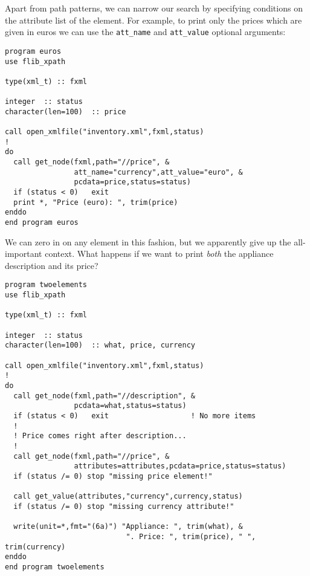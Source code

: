 \documentclass[11pt]{article}
\begin{document}
Apart from path patterns, we can narrow our search by specifying
conditions on the attribute list of the element. For example, to print
only the prices which are given in euros we can use the
\texttt{att\_name} and \texttt{att\_value} optional arguments:
%
\begin{verbatim}
program euros
use flib_xpath

type(xml_t) :: fxml

integer  :: status
character(len=100)  :: price

call open_xmlfile("inventory.xml",fxml,status)
!
do
  call get_node(fxml,path="//price", &
                att_name="currency",att_value="euro", &
                pcdata=price,status=status)
  if (status < 0)   exit
  print *, "Price (euro): ", trim(price)
enddo
end program euros
\end{verbatim}
%
We can zero in on any element in this fashion, but we apparently give
up the all-important context. What happens if we want to print
\textsl{both} the appliance description and its price?
%
\begin{verbatim}
program twoelements
use flib_xpath

type(xml_t) :: fxml

integer  :: status
character(len=100)  :: what, price, currency

call open_xmlfile("inventory.xml",fxml,status)
!
do
  call get_node(fxml,path="//description", &
                pcdata=what,status=status)
  if (status < 0)   exit                   ! No more items
  !
  ! Price comes right after description...
  !
  call get_node(fxml,path="//price", &
                attributes=attributes,pcdata=price,status=status)
  if (status /= 0) stop "missing price element!"
  
  call get_value(attributes,"currency",currency,status)
  if (status /= 0) stop "missing currency attribute!"
  
  write(unit=*,fmt="(6a)") "Appliance: ", trim(what), &
                            ". Price: ", trim(price), " ", trim(currency)
enddo
end program twoelements
\end{verbatim}
%
\end{document}
